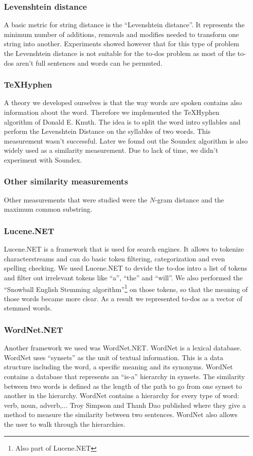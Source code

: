 \documentclass[a4paper,titlepage]{article}
\begin{document}
\subsubsection{Levenshtein distance}
A basic metric for string distance is the ``Levenshtein distance''. It represents the minimum number of additions, removals and modifies needed to transform one string into another. Experiments showed however that for this type of problem the Levenshtein distance is not suitable for the to-dos problem as most of the to-dos aren't full sentences and words can be permuted.
\subsubsection{TeXHyphen}
A theory we developed ourselves is that the way words are spoken contains also information about the word. Therefore we implemented the TeXHyphen algorithm\cite[p.376-406]{knuth1986tex} of Donald E. Knuth. The idea is to split the word intro syllables and perform the Levenshtein Distance on the syllables of two words. This measurement wasn't successful. Later we found out the Soundex algorithm is also widely used as a similarity measurement. Due to lack of time, we didn't experiment with Soundex.
\subsubsection{Other similarity measurements}
Other measurements that were studied were the $N$-gram distance and the maximum common substring.
\subsubsection{Lucene.NET}
Lucene.NET is a framework that is used for search engines. It allows to tokenize characterstreams and can do basic token filtering, categorization and even spelling checking. We used Lucene.NET to devide the to-dos intro a list of tokens and filter out irrelevant tokens like ``a'', ``the'' and ``will''. We also performed the ``Snowball English Stemming algorithm''\footnote{Also part of Lucene.NET} on those tokens, so that the meaning of those words became more clear. As a result we represented to-dos as a vector of stemmed words.
\subsubsection{WordNet.NET}
Another framework we used was WordNet.NET. WordNet is a lexical database. WordNet uses ``synsets'' as the unit of textual information. This is a data structure including the word, a specific meaning and its synonyms. WordNet contains a database that represents an ``is-a'' hierarchy in synsets. The similarity between two words is defined as the length of the path to go from one synset to another in the hierarchy. WordNet contains a hierarchy for every type of word: verb, noun, adverb,... Troy Simpson and Thanh Dao published \cite{codeproject1} where they give a method to measure the similarity between two sentences. WordNet also allows the user to walk through the hierarchies.
\end{document}
